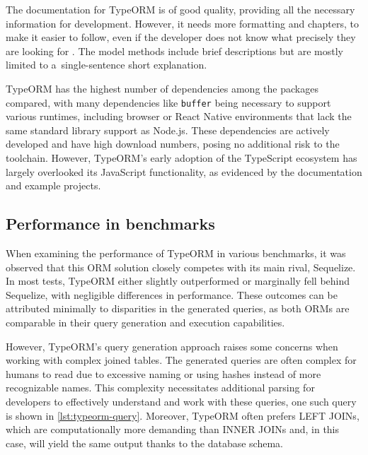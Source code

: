 The documentation for TypeORM is of good quality, providing all the necessary
information for development. However, it needs more formatting and chapters,
to make it easier to follow, even if the developer does not know what precisely
they are looking for \cite{typeORMDocs}. The model methods include brief
descriptions but are mostly limited to a~single-sentence short explanation.

TypeORM has the highest number of dependencies among the packages compared, with
many dependencies like \texttt{buffer} being necessary to support various
runtimes, including browser or React Native environments that lack the same
standard library support as Node.js. These dependencies are actively developed
and have high download numbers, posing no additional risk to the toolchain.
However, TypeORM's early adoption of the TypeScript ecosystem has largely
overlooked its JavaScript functionality, as evidenced by the documentation and
example projects.

\subsection*{Performance in benchmarks}

When examining the performance of TypeORM in various benchmarks, it was observed
that this ORM solution closely competes with its main rival, Sequelize. In most
tests, TypeORM either slightly outperformed or marginally fell behind Sequelize,
with negligible differences in performance. These outcomes can be attributed
minimally to disparities in the generated queries, as both ORMs are comparable
in their query generation and execution capabilities.

However, TypeORM's query generation approach raises some concerns when working
with complex joined tables. The generated queries are often complex for humans
to read due to excessive naming or using hashes instead of more recognizable
names. This complexity necessitates additional parsing for developers to
effectively understand and work with these queries, one such query is shown in
\autoref{lst:typeorm-query}. Moreover, TypeORM often prefers LEFT JOINs, which
are computationally more demanding than INNER JOINs and, in this case, will
yield the same output thanks to the database schema.


